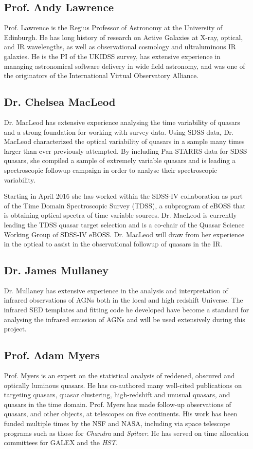 \subsection*{Prof. Andy Lawrence}
Prof. Lawrence is the Regius Professor of Astronomy at the University
of Edinburgh. He has long history of research on Active Galaxies at
X-ray, optical, and IR wavelengths, as well as observational cosmology
and ultraluminous IR galaxies. He is the PI of the UKIDSS survey, has
extensive experience in managing astronomical software delivery in
wide field astronomy, and was one of the originators of the
International Virtual Observatory Alliance.


\subsection*{Dr. Chelsea MacLeod}
Dr. MacLeod has extensive experience analysing the time variability of
quasars and a strong foundation for working with survey data.  Using
SDSS data, Dr. MacLeod characterized the optical variability of
quasars in a sample many times larger than ever previously attempted.
By including Pan-STARRS data for SDSS quasars, she compiled a sample
of extremely variable quasars and is leading a spectroscopic followup
campaign in order to analyse their spectroscopic variability.

\smallskip \smallskip \noindent
Starting in April 2016 she has worked within the SDSS-IV collaboration
as part of the Time Domain Spectroscopic Survey (TDSS), a subprogram
of eBOSS that is obtaining optical spectra of time variable sources.
Dr. MacLeod is currently leading the TDSS quasar target selection and
is a co-chair of the Quasar Science Working Group of SDSS-IV
eBOSS. Dr. MacLeod will draw from her experience in the optical to
assist in the observational followup of quasars in the IR.


\subsection*{Dr. James Mullaney}
Dr. Mullaney has extensive experience in the analysis and
interpretation of infrared observations of AGNs both in the local and
high redshift Universe. The infrared SED templates and fitting code he
developed have become a standard for analysing the infrared emission
of AGNs and will be used extensively during this project.

\subsection*{Prof. Adam Myers}
Prof. Myers is an expert on the statistical analysis of reddened,
obscured and optically luminous quasars. He has co-authored many
well-cited publications on targeting quasars, quasar clustering,
high-redshift and unusual quasars, and quasars in the time
domain. Prof. Myers has made follow-up observations of quasars, and
other objects, at telescopes on five continents. His work has been
funded multiple times by the NSF and NASA, including via space
telescope programs such as those for {\it Chandra} and {\it Spitzer}. He has
served on time allocation committees for GALEX and the {\it HST}. 

